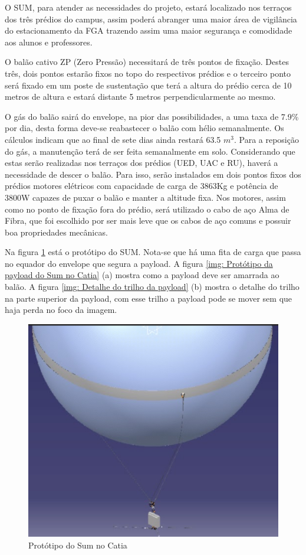O SUM, para atender as necessidades do projeto, estará localizado nos terraços dos três prédios do campus, assim poderá abranger uma maior área de vigilância do estacionamento da FGA trazendo assim uma maior segurança e comodidade aos alunos e professores.

O balão cativo ZP (Zero Pressão) necessitará de três pontos de fixação. Destes três, dois pontos estarão fixos no topo do respectivos prédios e o terceiro ponto será fixado em um poste de sustentação que terá a altura do prédio cerca de 10 metros de altura e estará distante 5 metros perpendicularmente ao mesmo.

O gás do balão sairá do envelope, na pior das possibilidades, a uma taxa de 7.9\% por dia, desta forma deve-se reabastecer o balão com hélio semanalmente. Os cálculos indicam que ao final de sete dias ainda restará 63.5 $m^{3}$. Para a reposição do gás, a manutenção terá de ser feita semanalmente em solo. Considerando que estas serão realizadas nos terraços dos prédios (UED, UAC e RU), haverá a necessidade de descer o balão. Para isso, serão instalados em dois pontos fixos dos prédios motores elétricos com capacidade de carga de 3863Kg e potência de 3800W capazes de puxar o balão e manter a altitude fixa. Nos motores, assim como no ponto de fixação fora do prédio, será utilizado o cabo de aço Alma de Fibra, que foi escolhido por ser mais leve que os cabos de aço comuns e possuir boa propriedades mecânicas.

Na figura \ref{img: Protótipo do Sum no Catia} está o protótipo do SUM. Nota-se que há uma fita de carga que passa no equador do envelope que segura a payload. A figura \ref{img: Protótipo da payload do Sum no Catia}  (a)  mostra como a payload deve ser amarrada ao balão. A figura \ref{img: Detalhe do trilho da payload} (b) mostra o detalhe do trilho na parte superior da payload, com esse trilho a payload pode se mover sem que haja perda no foco da imagem.
\begin{figure}[htp]
	\centering
	\includegraphics[scale=0.50]{figuras/catiadobalao}
	\caption{Protótipo do Sum no Catia}
	\label{img: Protótipo do Sum no Catia}
\end{figure}

